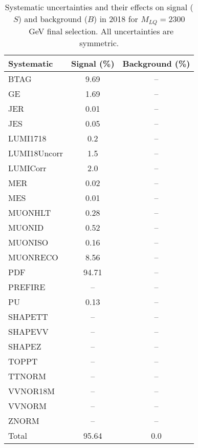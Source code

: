 \begin{table}[htbp]
\begin{center}
\caption{Systematic uncertainties and their effects on signal ($S$) and background ($B$) in 2018 for $M_{LQ}=2300$~GeV final selection. All uncertainties are symmetric.}
\begin{tabular}{lcc}
\hline\hline
Systematic & Signal (\%) & Background (\%) \\ \hline 
BTAG & 9.69 & --\\ 
GE & 1.69 & --\\ 
JER & 0.01 & --\\ 
JES & 0.05 & --\\ 
LUMI1718 & 0.2 & --\\ 
LUMI18Uncorr & 1.5 & --\\ 
LUMICorr & 2.0 & --\\ 
MER & 0.02 & --\\ 
MES & 0.01 & --\\ 
MUONHLT & 0.28 & --\\ 
MUONID & 0.52 & --\\ 
MUONISO & 0.16 & --\\ 
MUONRECO & 8.56 & --\\ 
PDF & 94.71 & --\\ 
PREFIRE & -- & --\\ 
PU & 0.13 & --\\ 
SHAPETT & -- & --\\ 
SHAPEVV & -- & --\\ 
SHAPEZ & -- & --\\ 
TOPPT & -- & --\\ 
TTNORM & -- & --\\ 
VVNOR18M & -- & --\\ 
VVNORM & -- & --\\ 
ZNORM & -- & --\\ 
Total & 95.64 & 0.0\\ \hline \hline
\end{tabular}
\label{tab:SysUncertainties_uujj_2300}
\end{center}
\end{table}

